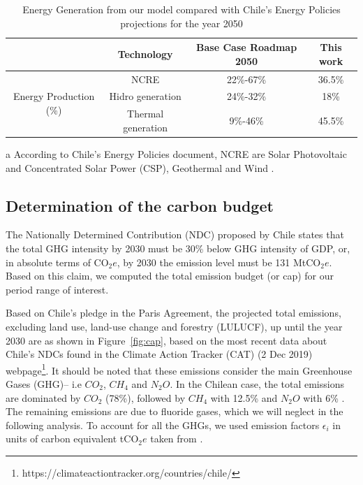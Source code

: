 \documentclass[11pt, letterpaper]{article}
\begin{document}
\begin{table}[!htbp]
\centering
  \begin{threeparttable}[t]
       \begin{tabular}{ c c c c } 
\hline
 & Technology & Base Case Roadmap 2050 & This work \\
\hline
\multirow{4}{8em}{Energy Production (\%)} & NCRE\tnote{a} & 22\%-67\% & 36.5\% \\ 
 & Hidro generation & 24\%-32\% & 18\% \\ 
& Thermal generation & 9\%-46\% & 45.5\% \\
\hline
\end{tabular}
     \begin{tablenotes}
     \footnotesize{
     \item[a] According to Chile's Energy Policies document, NCRE are Solar Photovoltaic and Concentrated Solar Power (CSP), Geothermal and Wind .
     }
   \end{tablenotes}
    \end{threeparttable}%
    \caption{Energy Generation from our model compared with Chile's Energy Policies projections for the year 2050}
  \label{tab:bc_comp}%
\end{table}%



\subsection{Determination of the carbon budget}\label{sec:cap}

The Nationally Determined Contribution (NDC) proposed by Chile states that the total GHG intensity by 2030 must be 30\% below GHG intensity of GDP, or, in absolute terms of CO$_2e$, by 2030 the emission level must be 131 MtCO$_2e$. Based on this claim, we computed the total emission budget (or cap) for our period range of interest. 
\smallskip

Based on Chile's pledge in the Paris Agreement, the projected total emissions, excluding land use, land-use change and  forestry (LULUCF), up until the year 2030 are as shown in Figure~\ref{fig:cap}, based on the most recent data about Chile's NDCs found in the Climate Action Tracker (CAT) (2 Dec 2019) webpage\footnote{https://climateactiontracker.org/countries/chile/}. It should be noted that these emissions consider the main Greenhouse Gases (GHG)-- i.e $CO_2$, $CH_4$ and $N_2O$.  In the Chilean case, the total emissions are dominated by $CO_2$ (78\%), followed by $CH_4$ with 12.5\% and $N_2O$  with 6\% \cite{ChileInformeBienal2016}. The remaining emissions are due to fluoride gases, which we will neglect in the following analysis. To account for all the GHGs, we used emission factors $\epsilon_i$ in units of carbon equivalent tCO$_2e$ taken from \cite{IPCC2014}.
\end{document}
